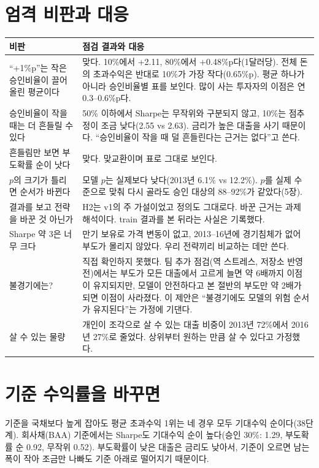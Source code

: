 \section{엄격 비판과 대응}
\begin{table}[H]\centering\small
\begin{tabularx}{\linewidth}{@{}>{\raggedright\arraybackslash}p{50mm}L@{}}\toprule
비판 & 점검 결과와 대응\\\midrule
``+1\%p''는 작은 승인비율이 끌어올린 평균이다 & 맞다. 10\%에서 +2.11, 80\%에서 +0.48\%p다(1달러당). 전체 돈의 초과수익은 반대로 10\%가 가장 작다(0.65\%p). 평균 하나가 아니라 승인비율별 표를 보인다. 많이 사는 투자자의 이점은 연 0.3--0.6\%p다.\\
승인비율이 작을 때는 더 흔들릴 수 있다 & 50\% 이하에서 Sharpe는 무작위와 구분되지 않고, 10\%는 점추정이 조금 낮다(2.55 vs 2.63). 금리가 높은 대출을 사기 때문이다. ``승인비율이 작을 때 덜 흔들린다는 근거는 없다''고 쓴다.\\
흔들림만 보면 부도확률 순이 낫다 & 맞다. 맞교환이며 표로 그대로 보인다.\\
$p$의 크기가 틀리면 순서가 바뀐다 & 모델 $p$는 실제보다 낮다(2013년 6.1\% vs 12.2\%). $p$를 실제 수준으로 맞춰 다시 골라도 승인 대상의 88--92\%가 같았다(5장).\\
결과를 보고 전략을 바꾼 것 아닌가 & H2는 v1의 주 가설이었고 정의도 그대로다. 바꾼 근거는 과제 해석이다. train 결과를 본 뒤라는 사실은 기록했다.\\
Sharpe 약 3은 너무 크다 & 만기 보유로 가격 변동이 없고, 2013--16년에 경기침체가 없어 부도가 몰리지 않았다. 우리 전략끼리 비교하는 데만 쓴다.\\
불경기에는? & 직접 확인하지 못했다. 팀 추가 점검(역 스트레스, 저장소 반영 전)에서는 부도가 모든 대출에서 고르게 늘면 약 6배까지 이점이 유지되지만, 모델이 안전하다고 본 절반의 부도만 약 2배가 되면 이점이 사라졌다. 이 제안은 ``불경기에도 모델의 위험 순서가 유지된다''는 가정에 기댄다.\\
살 수 있는 물량 & 개인이 조각으로 살 수 있는 대출 비중이 2013년 72\%에서 2016년 27\%로 줄었다. 상위부터 원하는 만큼 살 수 있다고 가정했다.\\\bottomrule
\end{tabularx}
\end{table}

\section{기준 수익률을 바꾸면}
기준을 국채보다 높게 잡아도 평균 초과수익 1위는 네 경우 모두 기대수익 순이다(38단계). 회사채(BAA) 기준에서는 Sharpe도 기대수익 순이 높다(승인 30\%: 1.29, 부도확률 순 0.92, 무작위 0.52). 부도확률이 낮은 대출은 금리도 낮아서, 기준이 오르면 남는 폭이 작아 조금만 나빠도 기준 아래로 떨어지기 때문이다.

